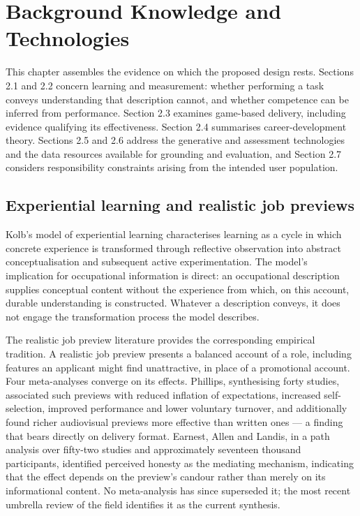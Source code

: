 \newpage
\section{Background Knowledge and Technologies}

This chapter assembles the evidence on which the proposed design rests. Sections 2.1 and 2.2 concern learning and measurement: whether performing a task conveys understanding that description cannot, and whether competence can be inferred from performance. Section 2.3 examines game-based delivery, including evidence qualifying its effectiveness. Section 2.4 summarises career-\allowbreak{}development theory. Sections 2.5 and 2.6 address the generative and assessment technologies and the data resources available for grounding and evaluation, and Section 2.7 considers responsibility constraints arising from the intended user population.

\subsection{Experiential learning and realistic job previews}

Kolb's model of experiential learning\cite{r12} characterises learning as a cycle in which concrete experience is transformed through reflective observation into abstract conceptualisation and subsequent active experimentation. The model's implication for occupational information is direct: an occupational description supplies conceptual content without the experience from which, on this account, durable understanding is constructed. Whatever a description conveys, it does not engage the transformation process the model describes.

The realistic job preview literature provides the corresponding empirical tradition\cite{r13}. A realistic job preview presents a balanced account of a role, including features an applicant might find unattractive, in place of a promotional account. Four meta-\allowbreak{}analyses converge on its effects\cite{r8,r9,r14,r15}. Phillips\cite{r8}, synthesising forty studies, associated such previews with reduced inflation of expectations, increased self-\allowbreak{}selection, improved performance and lower voluntary turnover, and additionally found richer audiovisual previews more effective than written ones --- a finding that bears directly on delivery format. Earnest, Allen and Landis\cite{r9}, in a path analysis over fifty-two studies and approximately seventeen thousand participants, identified perceived honesty as the mediating mechanism, indicating that the effect depends on the preview's candour rather than merely on its informational content. No meta-\allowbreak{}analysis has since superseded it; the most recent umbrella review of the field identifies it as the current synthesis\cite{r16}.

